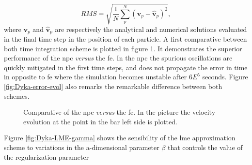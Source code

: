 \documentclass[preprint,12pt,a4paper]{elsarticle}
\newcommand{\vect}[1]{
  \ensuremath{\mathbf{{#1}}}
}
\begin{document}
\begin{equation}
  \label{eq:RMS}
  RMS = \sqrt{\frac{1}{N} \sum^{N}_p \left( \vect{v}_p - \hat{\vect{v}}_p \right)^2},
\end{equation}
where $\vect{v}_p$ and $\hat{\vect{v}}_p$ are respectively the analytical and
numerical solutions evaluated in the final time step in the position
of each particle. A first comparative between both time integration
scheme is plotted in figure \ref{fig:Dyka-NPC-FE}. It demonstrates the
superior performance of the \acrshort{npc} \textit{versus} the \acrshort{fe}. In the \acrshort{npc} the
spurious oscillations are quickly mitigated in the first time steps,
and does not propagate the error in time in opposite to \acrshort{fe} where the
simulation becomes unstable after $6E^{5}$ seconds. Figure
\ref{fig:Dyka-error-evol} also remarks the remarkable difference
between both schemes. 
\begin{figure}\sidecaption
  \centering
  \caption{Comparative of the \acrshort{npc} \textit{versus} the \acrshort{fe}. In the
    picture the velocity evolution at the point in the bar left side
    is plotted.}
  \label{fig:Dyka-NPC-FE}
\end{figure}
Figure \eqref{fig:Dyka-LME-gamma} shows the sensibility of the \acrshort{lme}
approximation scheme to variations in the a-dimensional parameter
$\beta$ that controls the value of the regularization parameter
\end{document}
